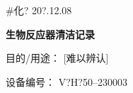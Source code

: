 \documentclass[UTF8,10pt,a4paper,fontset=fandol]{ctexart}
\newcommand{\fieldvalue}[1]{#1}
\newcommand{\handwritten}[1]{#1}
\begin{document}

\handwritten{\#化? 20?.12.08}

\newpage

\begin{center}
\textbf{生物反应器清洁记录}
\end{center}

\noindent
目的/用途：
\fieldvalue{\handwritten{[难以辨认]}}

\noindent
设备编号：
\fieldvalue{\handwritten{V?H?50--230003}}

\smallskip
\end{document}
